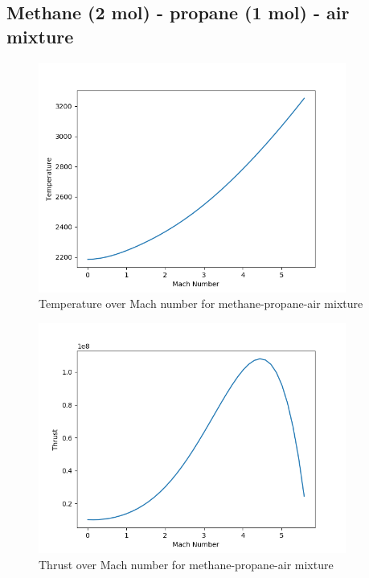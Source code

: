 \documentclass[a4paper,11pt]{article}
\begin{document}
\subsection{Methane (2 mol) - propane (1 mol) - air mixture}
	\begin{figure}[H]
		\centering
       		\includegraphics[width=0.9\textwidth]{Metan(2mol)_propan(1mol)_pow/Temperature_over_Mach.png}
       		\caption{Temperature over Mach number for methane-propane-air mixture}
	\end{figure}
	\begin{figure}[H]
		\centering
		\includegraphics[width=0.9\textwidth]{Metan(2mol)_propan(1mol)_pow/Thrust_over_Mach.png}
       		\caption{Thrust over Mach number for methane-propane-air mixture}
	\end{figure}
\end{document}
